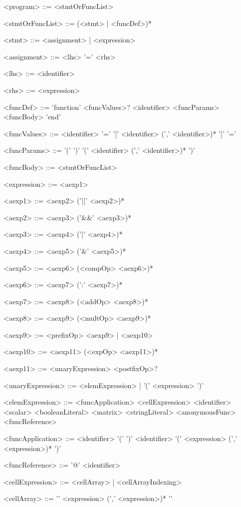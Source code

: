 \setlength{\grammarindent}{12em} %
\begin{grammar}
<program> ::= <stmtOrFuncList>

<stmtOrFuncList> ::= (<stmt> | <funcDef>)*

<stmt> ::= <assignment> | <expression>

<assignment> ::= <lhs> '=' <rhs>

<lhs> ::= <identifier>

<rhs> ::= <expression>

<funcDef> ::= 'function' <funcValues>? <identifier> <funcParams> <funcBody> 'end'

<funcValues> ::= <identifier> '='
\alt '[' <identifier> (',' <identifier>)* ']' '='

<funcParams> ::= '(' ')'
\alt '(' <identifier> (',' <identifier>)* ')'

<funcBody> ::= <stmtOrFuncList>

<expression> ::= <aexp1>

<aexp1> ::= <aexp2> ('||' <aexp2>)*

<aexp2> ::= <aexp3> ('\&\&' <aexp3>)*

<aexp3> ::= <aexp4> ('|' <aexp4>)*

<aexp4> ::= <aexp5> ('\&' <aexp5>)*

<aexp5> ::= <aexp6> (<compOp> <aexp6>)*

<aexp6> ::= <aexp7> (':' <aexp7>)*

<aexp7> ::= <aexp8> (<addOp> <aexp8>)*

<aexp8> ::= <aexp9> (<multOp> <aexp9>)*

<aexp9> ::= <prefixOp> <aexp9> | <aexp10>

<aexp10> ::= <aexp11> (<expOp> <aexp11>)*

<aexp11> ::= <unaryExpression> <postfixOp>?

<unaryExpression> ::= <elemExpression> | '(' <expression> ')'

<elemExpression> ::= <funcApplication> \alt <cellExpression> \alt <identifier> \alt <scalar> \alt <booleanLiteral> \alt <matrix> \alt <stringLiteral> \alt <anonymousFunc> \alt <funcReference>

<funcApplication> ::= <identifier> '(' ')'
\alt <identifier> '(' <expression> (',' <expression>)* ')'

<funcReference> ::= '@' <identifier>

<cellExpression> ::= <cellArray> | <cellArrayIndexing>

<cellArray> ::= '{' <expression> (',' <expression>)* '}'


\end{grammar}
